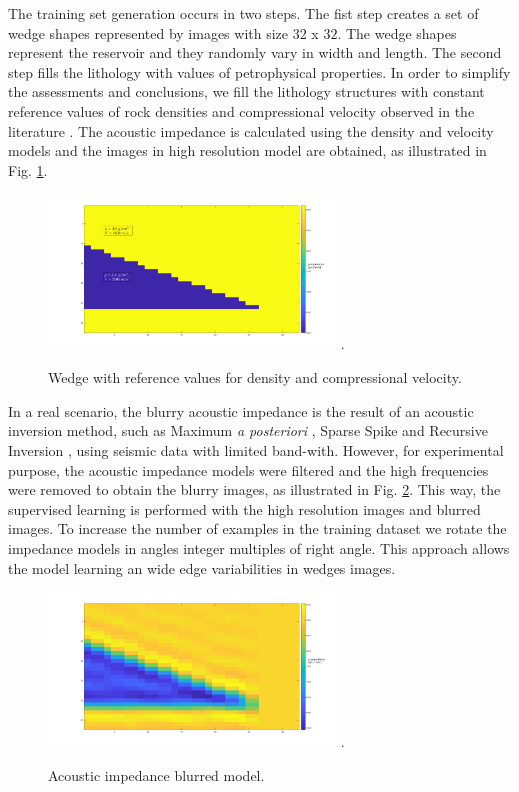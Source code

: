\documentclass[conference,compsoc]{IEEEtran}
\begin{document}
The training set generation occurs in two steps.
The fist step creates a set of wedge shapes represented
by images with size $32$ x $32$. The wedge shapes represent the reservoir and they
randomly vary in width and length. The second step fills the lithology with values of petrophysical properties.
In order to simplify the assessments and conclusions, we fill the lithology structures with constant
reference values of rock densities and compressional velocity observed in the literature \cite{Mavko2009}.
The acoustic impedance is calculated using the density and velocity models and the images in high
resolution model are obtained, as illustrated in  Fig. \ref{fig_lithology}.
\begin{figure}[!t]
\centering
\includegraphics[width=3.0in]{Figs/Image_Paper}
\DeclareGraphicsExtensions.
\caption{Wedge with reference values for density and compressional velocity.}
\label{fig_lithology}
\end{figure}
In a real scenario, the blurry acoustic impedance is the
result of an acoustic inversion method, such as Maximum \textit{a posteriori} \cite{Buland2003,Figueiredo2012}, Sparse Spike \cite{Debeye1990} 
and Recursive Inversion \cite{Chopra2001}, using seismic data with limited band-with.
However, for experimental purpose, the acoustic impedance models were filtered
and the high frequencies were removed to obtain the blurry images, as illustrated in Fig. \ref{fig_blur}.
This way, the supervised learning is performed with the high resolution images and blurred images.
To increase the number of examples in the training dataset we rotate
the impedance models in angles integer multiples of right angle. 
This approach allows the model learning an wide edge variabilities
in wedges images.
\begin{figure}[!t]
\centering
\includegraphics[width=3.0in]{Figs/Image_Paper_blurred}
\DeclareGraphicsExtensions.
\caption{Acoustic impedance blurred model.}
\label{fig_blur}
\end{figure}
\end{document}
